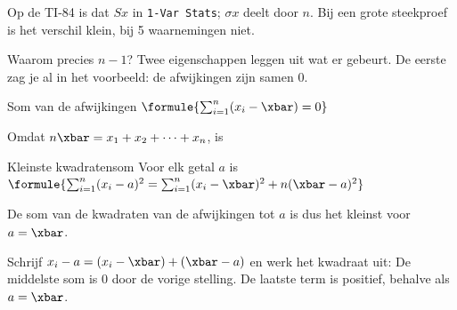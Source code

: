 Op de TI-84 is dat $Sx$ in \texttt{1-Var Stats}; $\sigma x$ deelt door $n$. Bij een grote steekproef is het verschil klein, bij 5 waarnemingen niet.


\begin{oefeningen}
\end{oefeningen}

Waarom precies $n - 1$? Twee eigenschappen leggen uit wat er gebeurt. De eerste zag je al in het voorbeeld: de afwijkingen zijn samen 0.

\begin{theorie}
\begin{stelling}{Som van de afwijkingen}
\qquad $\formule{\sum_{i=1}^{n} (x_i - \xbar) = 0}$
\end{stelling}

\begin{bewijs}
Omdat $n\xbar = x_1 + x_2 + \cdots + x_n$, is
\end{bewijs}

\begin{stelling}{Kleinste kwadratensom}
Voor elk getal $a$ is \quad $\formule{\sum_{i=1}^{n} (x_i - a)^2 = \sum_{i=1}^{n} (x_i - \xbar)^2 + n(\xbar - a)^2}$

\vspace{1mm}
De som van de kwadraten van de afwijkingen tot $a$ is dus het kleinst voor $a = \xbar$.
\end{stelling}

\begin{bewijs}
Schrijf $x_i - a = (x_i - \xbar) + (\xbar - a)$ en werk het kwadraat uit:
De middelste som is 0 door de vorige stelling. De laatste term is positief, behalve als $a = \xbar$.
\end{bewijs}
\end{theorie}

